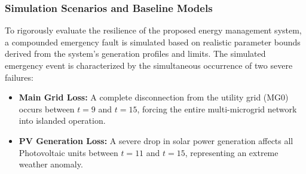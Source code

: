 \begin{table}[htbp]
    \centering
    \caption{Technical and Economic Parameters of DG and BESS}
    \label{tab:dg_bess_params}
\end{table}

\subsubsection{Simulation Scenarios and Baseline Models}
To rigorously evaluate the resilience of the proposed energy management system, a compounded emergency fault is simulated based on realistic parameter bounds derived from the system's generation profiles and limits. The simulated emergency event is characterized by the simultaneous occurrence of two severe failures:
\begin{itemize}
    \item \textbf{Main Grid Loss:} A complete disconnection from the utility grid (MG0) occurs between $t=9$ and $t=15$, forcing the entire multi-microgrid network into islanded operation.
    \item \textbf{PV Generation Loss:} A severe drop in solar power generation affects all Photovoltaic units between $t=11$ and $t=15$, representing an extreme weather anomaly.
\end{itemize}

